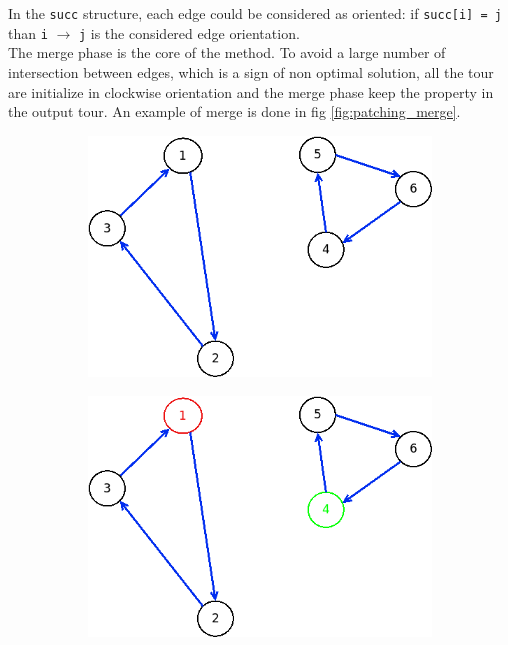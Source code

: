 In the \texttt{succ} structure, each edge could be considered as oriented: if \texttt{succ[i] = j} than \texttt{i} $\rightarrow$ \texttt{j} is the considered edge orientation. \\
The merge phase is the core of the method. To avoid a large number of intersection between edges, which is a sign of non optimal solution, all the tour are initialize in clockwise orientation and the merge phase keep the property in the output tour. An example of merge is done in fig \ref{fig:patching_merge}.
\begin{figure}[!h]
	\begin{subfigure}{.26\columnwidth}
		\includegraphics[width=\columnwidth]{img/patching_merge1.png}
		\caption{}
		\label{fig:patching_merge1}
	\end{subfigure}
	\hfill%
	\begin{subfigure}{.26\columnwidth}
		\includegraphics[width=\columnwidth]{img/patching_merge2.png}

\end{subfigure}
\end{figure}
